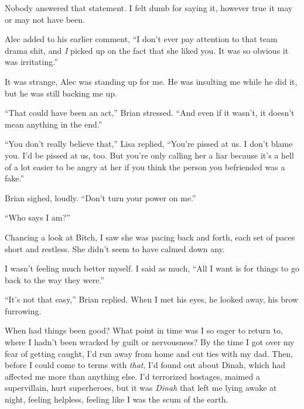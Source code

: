 Nobody answered that statement.  I felt dumb for saying it, however true it may or may not have been.



Alec added to his earlier comment, ``I don't ever pay attention to that team drama shit, and \emph{I} picked up on the fact that she liked you.  It was so obvious it was irritating.''



It was strange, Alec was standing up for me.  He was insulting me while he did it, but he was still backing me up.



``That could have been an act,'' Brian stressed.  ``And even if it wasn't, it doesn't mean anything in the end.''



``You don't really believe that,'' Lisa replied, ``You're pissed at us.  I don't blame you.  I'd be pissed at us, too.  But you're only calling her a liar because it's a hell of a lot easier to be angry at her if you think the person you befriended was a fake.''



Brian sighed, loudly. ``Don't turn your power on me.''



``Who says I am?''



Chancing a look at Bitch, I saw she was pacing back and forth, each set of paces short and restless.  She didn't seem to have calmed down any.



I wasn't feeling much better myself.  I said as much, ``All I want is for things to go back to the way they were.''



``It's not that easy,'' Brian replied.  When I met his eyes, he looked away, his brow furrowing.



When had things been good?  What point in time was I so eager to return to, where I hadn't been wracked by guilt or nervousness?  By the time I got over my fear of getting caught, I'd run away from home and cut ties with my dad.  Then, before I could come to terms with \emph{that}, I'd found out about Dinah, which had affected me more than anything else.  I'd terrorized hostages, maimed a supervillain, hurt superheroes, but it was \emph{Dinah} that left me lying awake at night, feeling helpless, feeling like I was the scum of the earth.



